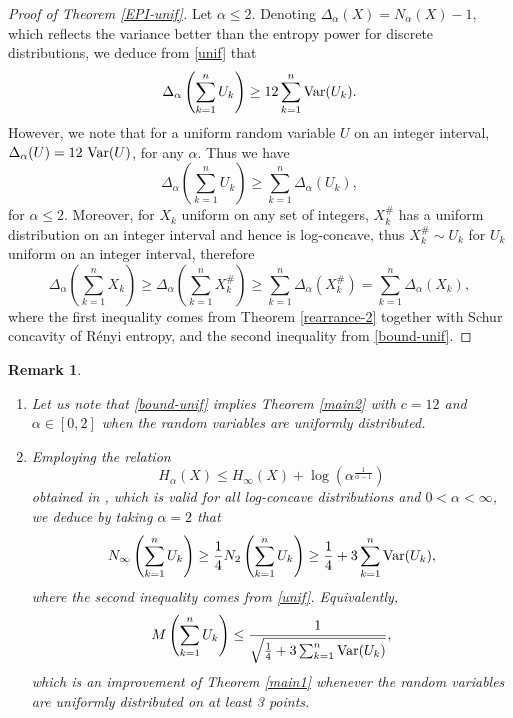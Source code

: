 \documentclass[11pt]{article}
\newtheorem{remark}[thm]{Remark}
\DeclareMathOperator{\Var}{Var}
\newcommand{\1}{[1]}
\def\Var{{\rm Var}}
\begin{document}
\begin{proof}[Proof of Theorem \ref{EPI-unif}]
    Let $\alpha \leq 2$. Denoting $\Delta_\alpha(X) = N_\alpha(X) - 1$, which reflects the variance better than the entropy power for discrete distributions, we deduce from \eqref{unif} that
\[
    \Delta_\alpha \left( \sum_{k=1}^n U_k \right) \geq 12 \sum_{k=1}^n \Var(U_k).
\]
However, we note that for a uniform random variable $U$ on an integer interval, $\Delta_\alpha(U) = 12 \ \Var(U)$, for any $\alpha$. Thus we have
\begin{equation}\label{bound-unif}
    \Delta_\alpha \left( \sum_{k=1}^n U_k \right) \geq \sum_{k=1}^n \Delta_\alpha(U_k),
\end{equation}
for $\alpha \leq 2$. Moreover, for $X_k$ uniform on any set of integers, $X_k^{\#}$ has a uniform distribution on an integer interval and hence is log-concave, thus $X_k^{\#} \sim U_k$ for $U_k$ uniform on an integer interval, therefore
\begin{equation*}
\Delta_\alpha \left( \sum_{k=1}^n X_k \right) \geq \Delta_\alpha \left( \sum_{k=1}^n X_k^{\#} \right) \geq \sum_{k=1}^n \Delta_\alpha \left( X_k^{\#} \right) = \sum_{k=1}^n \Delta_\alpha(X_k),
\end{equation*}
where the first inequality comes from Theorem \ref{rearrance-2} together with Schur concavity of R\'enyi entropy, and the second inequality from \eqref{bound-unif}.
\end{proof}


\begin{remark}
    \begin{enumerate}
        \item Let us note that \eqref{bound-unif} implies Theorem \ref{main2} with $c=12$ and $\alpha \in [0,2]$ when the random variables are uniformly distributed.

        \item Employing the relation
$$ H_{\alpha}(X) \leq H_{\infty}(X) + \log(\alpha^{\frac{1}{\alpha - 1}}) $$
obtained in \cite{MT}, which is valid for all log-concave distributions and $0 < \alpha < \infty$, we deduce by taking $\alpha =2$ that
$$ N_{\infty} \left( \sum_{k=1}^n U_k \right) \geq \frac{1}{4} N_{2} \left( \sum_{k=1}^n U_k \right) \geq \frac{1}{4} + 3  \sum_{k=1}^n \Var(U_k), $$
where the second inequality comes from \eqref{unif}. Equivalently,
$$ M \left( \sum_{k=1}^n U_k \right) \leq \frac{1}{\sqrt{\frac{1}{4} + 3  \sum_{k=1}^n \Var(U_k)}}, $$
which is an improvement of Theorem \ref{main1} whenever the random variables are uniformly distributed on at least 3 points.
    \end{enumerate}
\end{remark}
\end{document}
